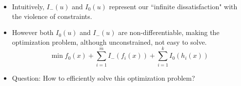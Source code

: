 \documentclass[mathserif]{beamer}
\begin{document}
{\begin{figure}[c]
\begin{minipage}[c]{0.35\textwidth}
\end{minipage}
\end{figure}

\begin{itemize}
	\item  Intuitively, $I_{-}( u )$  and $I_{0}( u )$  represent our ``infinite dissatisfaction" with the violence of constraints. 
	\item However both  $I_{0}( u )$ and $I_{-}( u )$ are non-differentiable, making the optimization problem, although unconstrained, not easy to solve. 
\[
	\min f_0({x}) + \sum_{i=1}^{m} I_{-}(f_i({x})) + \sum_{i=1}^k{I_0}(h_i({x}))
\]

	\item Question: How to efficiently solve this optimization problem? 
\end{itemize}

} 
\end{document}
